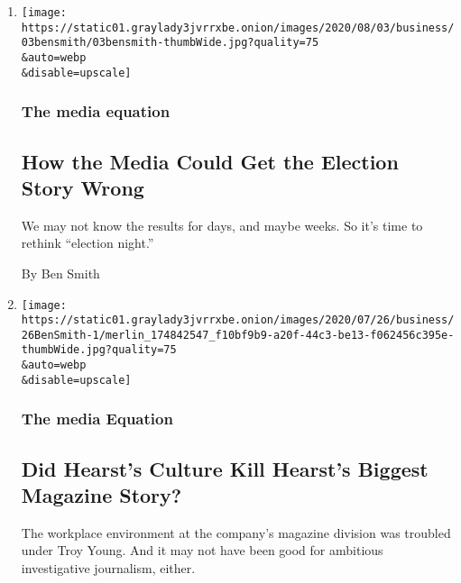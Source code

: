 \begin{enumerate}
\def\labelenumi{\arabic{enumi}.}
\item
  \href{/2020/08/02/business/media/election-coverage.html}{}

  \texttt{[image: https://static01.graylady3jvrrxbe.onion/images/2020/08/03/business/03bensmith/03bensmith-thumbWide.jpg?quality=75\\\&auto=webp\\\&disable=upscale]}

  \hypertarget{the-media-equation}{%
  \subsubsection{The media equation}\label{the-media-equation}}

  \hypertarget{how-the-media-could-get-the-election-story-wrong}{%
  \subsection{How the Media Could Get the Election Story
  Wrong}\label{how-the-media-could-get-the-election-story-wrong}}

  We may not know the results for days, and maybe weeks. So it's time to
  rethink ``election night.''

  By Ben Smith
\item
  \href{/2020/07/26/business/media/hearst-culture-magazines.html}{}

  \texttt{[image: https://static01.graylady3jvrrxbe.onion/images/2020/07/26/business/26BenSmith-1/merlin\_174842547\_f10bf9b9-a20f-44c3-be13-f062456c395e-thumbWide.jpg?quality=75\\\&auto=webp\\\&disable=upscale]}

  \hypertarget{the-media-equation-1}{%
  \subsubsection{The media Equation}\label{the-media-equation-1}}

  \hypertarget{did-hearsts-culture-kill-hearsts-biggest-magazine-story}{%
  \subsection{Did Hearst's Culture Kill Hearst's Biggest Magazine
  Story?}\label{did-hearsts-culture-kill-hearsts-biggest-magazine-story}}

  The workplace environment at the company's magazine division was
  troubled under Troy Young. And it may not have been good for ambitious
  investigative journalism, either.


\end{enumerate}
